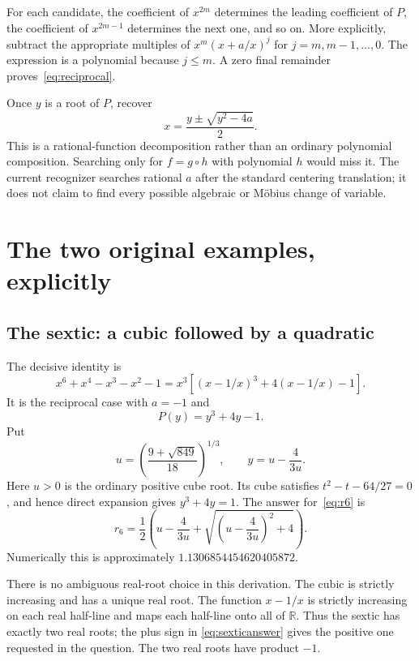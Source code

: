 \documentclass[11pt]{article}
\theoremstyle{definition}\newtheorem{definition}[theorem]{Definition}
\theoremstyle{remark}\newtheorem{remark}[theorem]{Remark}
\begin{document}
For each candidate, the coefficient of $x^{2m}$ determines the leading
coefficient of $P$, the coefficient of $x^{2m-1}$ determines the next one, and
so on. More explicitly, subtract the appropriate multiples of
$x^m(x+a/x)^j$ for $j=m,m-1,\ldots,0$. The expression is a polynomial because
$j\le m$. A zero final remainder proves~\eqref{eq:reciprocal}.

Once $y$ is a root of $P$, recover
\begin{equation}\label{eq:reciproots}
 x=\frac{y\pm\sqrt{y^2-4a}}2.
\end{equation}
This is a rational-function decomposition rather than an ordinary polynomial
composition. Searching only for $f=g\circ h$ with polynomial $h$ would miss it.
The current recognizer searches rational $a$ after the standard centering
translation; it does not claim to find every possible algebraic or M\"obius
change of variable.

\section{The two original examples, explicitly}

\subsection{The sextic: a cubic followed by a quadratic}

The decisive identity is
\begin{equation}\label{eq:sexticidentity}
 x^6+x^4-x^3-x^2-1
 =x^3\left[(x-1/x)^3+4(x-1/x)-1\right].
\end{equation}
It is the reciprocal case with $a=-1$ and
\begin{equation}
 P(y)=y^3+4y-1.
\end{equation}
Put
\begin{equation}\label{eq:sexticu}
 u=\left(\frac{9+\sqrt{849}}{18}\right)^{1/3},
 \qquad y=u-\frac4{3u}.
\end{equation}
Here $u>0$ is the ordinary positive cube root. Its cube satisfies
$t^2-t-64/27=0$, and hence direct expansion gives $y^3+4y=1$.
The answer for~\eqref{eq:r6} is
\begin{equation}\boxed{\displaystyle
 r_6=\frac12\left(u-\frac4{3u}
       +\sqrt{\left(u-\frac4{3u}\right)^2+4}\right).}\label{eq:sexticanswer}
\end{equation}
Numerically this is approximately $1.1306854454620405872$.

There is no ambiguous real-root choice in this derivation. The cubic is
strictly increasing and has a unique real root. The function $x-1/x$ is
strictly increasing on each real half-line and maps each half-line onto all
of $\mathbb R$. Thus the sextic has exactly two real roots; the plus sign in
\eqref{eq:sexticanswer} gives the positive one requested in the question.
The two real roots have product $-1$.
\end{document}

